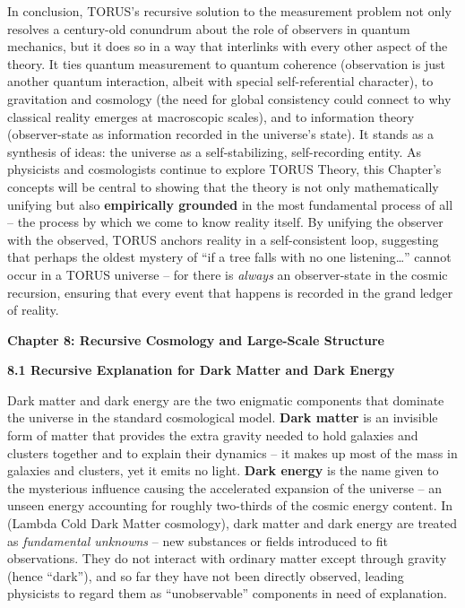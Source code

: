 \documentclass[
]{article}
\begin{document}
In conclusion, TORUS's recursive solution to the measurement problem not
only resolves a century-old conundrum about the role of observers in
quantum mechanics, but it does so in a way that interlinks with every
other aspect of the theory. It ties quantum measurement to quantum
coherence (observation is just another quantum interaction, albeit with
special self-referential character), to gravitation and cosmology (the
need for global consistency could connect to why classical reality
emerges at macroscopic scales), and to information theory
(observer-state as information recorded in the universe's state). It
stands as a synthesis of ideas: the universe as a self-stabilizing,
self-recording entity. As physicists and cosmologists continue to
explore TORUS Theory, this Chapter's concepts will be central to showing
that the theory is not only mathematically unifying but also
\textbf{empirically grounded} in the most fundamental process of all --
the process by which we come to know reality itself. By unifying the
observer with the observed, TORUS anchors reality in a self-consistent
loop, suggesting that perhaps the oldest mystery of ``if a tree falls
with no one listening\ldots'' cannot occur in a TORUS universe -- for
there is \emph{always} an observer-state in the cosmic recursion,
ensuring that every event that happens is recorded in the grand ledger
of reality.

\textbf{Chapter 8: Recursive Cosmology and Large-Scale Structure}

\textbf{8.1 Recursive Explanation for Dark Matter and Dark Energy}

Dark matter and dark energy are the two enigmatic components that
dominate the universe in the standard cosmological model. \textbf{Dark
matter} is an invisible form of matter that provides the extra gravity
needed to hold galaxies and clusters together and to explain their
dynamics -- it makes up most of the mass in galaxies and clusters, yet
it emits no light\hspace{0pt}. \textbf{Dark energy} is the name given to
the mysterious influence causing the accelerated expansion of the
universe -- an unseen energy accounting for roughly two-thirds of the
cosmic energy content. In \LambdaCDM (Lambda Cold Dark Matter cosmology), dark
matter and dark energy are treated as \emph{fundamental unknowns} -- new
substances or fields introduced to fit observations. They do not
interact with ordinary matter except through gravity (hence ``dark''),
and so far they have not been directly observed, leading physicists to
regard them as ``unobservable'' components in need of explanation.
\end{document}
